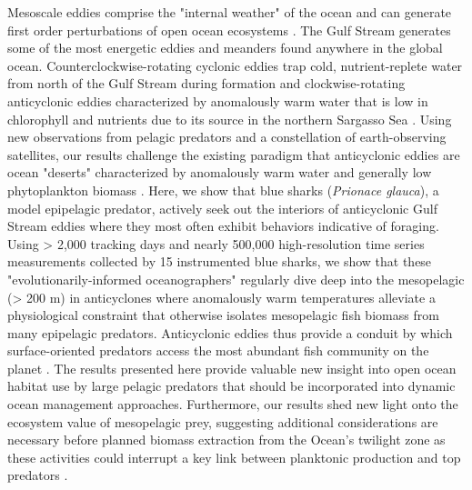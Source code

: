 

Mesoscale eddies comprise the "internal weather" of the ocean and can generate first order perturbations of open ocean ecosystems \citep{Mahadevan2014, McGillicuddy2007}. The Gulf Stream generates some of the most energetic eddies and meanders found anywhere in the global ocean.  Counterclockwise-rotating cyclonic eddies trap cold, nutrient-replete water from north of the Gulf Stream during formation and clockwise-rotating anticyclonic eddies characterized by anomalously warm water that is low in chlorophyll and nutrients due to its source in the northern Sargasso Sea \citep{Gaube2017DSR}. Using new observations from pelagic predators and a constellation of earth-observing satellites, our results challenge the existing paradigm that anticyclonic eddies are ocean "deserts" characterized by anomalously warm water and generally low phytoplankton biomass \citep{Gaube2017DSR, Williams1998}. Here, we show that blue sharks (\textit{Prionace glauca}), a model epipelagic predator, actively seek out the interiors of anticyclonic Gulf Stream eddies where they most often exhibit behaviors indicative of foraging. Using > 2,000 tracking days and nearly 500,000 high-resolution time series measurements collected by 15 instrumented blue sharks, we show that these "evolutionarily-informed oceanographers" regularly dive deep into the mesopelagic (> 200 m) in anticyclones where anomalously warm temperatures alleviate a physiological constraint that otherwise isolates mesopelagic fish biomass from many epipelagic predators. Anticyclonic eddies thus provide a conduit by which surface-oriented predators access the most abundant fish community on the planet \citep{Irigoien2014}. The results presented here provide valuable new insight into open ocean habitat use by large pelagic predators that should be incorporated into dynamic ocean management approaches. Furthermore, our results shed new light onto the ecosystem value of mesopelagic prey, suggesting additional considerations are necessary before planned biomass extraction from the Ocean's twilight zone as these activities could interrupt a key link between planktonic production and top predators \citep{Smith2011}.

